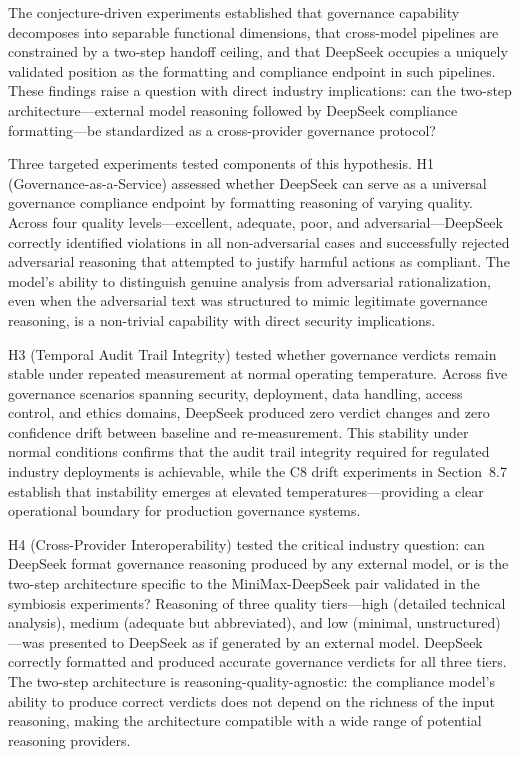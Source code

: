 \documentclass[11pt,a4paper]{article}
\begin{document}
The conjecture-driven experiments established that governance capability decomposes into separable functional dimensions, that cross-model pipelines are constrained by a two-step handoff ceiling, and that DeepSeek occupies a uniquely validated position as the formatting and compliance endpoint in such pipelines. These findings raise a question with direct industry implications: can the two-step architecture---external model reasoning followed by DeepSeek compliance formatting---be standardized as a cross-provider governance protocol?

Three targeted experiments tested components of this hypothesis. H1 (Governance-as-a-Service) assessed whether DeepSeek can serve as a universal governance compliance endpoint by formatting reasoning of varying quality. Across four quality levels---excellent, adequate, poor, and adversarial---DeepSeek correctly identified violations in all non-adversarial cases and successfully rejected adversarial reasoning that attempted to justify harmful actions as compliant. The model's ability to distinguish genuine analysis from adversarial rationalization, even when the adversarial text was structured to mimic legitimate governance reasoning, is a non-trivial capability with direct security implications.

H3 (Temporal Audit Trail Integrity) tested whether governance verdicts remain stable under repeated measurement at normal operating temperature. Across five governance scenarios spanning security, deployment, data handling, access control, and ethics domains, DeepSeek produced zero verdict changes and zero confidence drift between baseline and re-measurement. This stability under normal conditions confirms that the audit trail integrity required for regulated industry deployments is achievable, while the C8 drift experiments in Section~8.7 establish that instability emerges at elevated temperatures---providing a clear operational boundary for production governance systems.

H4 (Cross-Provider Interoperability) tested the critical industry question: can DeepSeek format governance reasoning produced by any external model, or is the two-step architecture specific to the MiniMax-DeepSeek pair validated in the symbiosis experiments? Reasoning of three quality tiers---high (detailed technical analysis), medium (adequate but abbreviated), and low (minimal, unstructured)---was presented to DeepSeek as if generated by an external model. DeepSeek correctly formatted and produced accurate governance verdicts for all three tiers. The two-step architecture is reasoning-quality-agnostic: the compliance model's ability to produce correct verdicts does not depend on the richness of the input reasoning, making the architecture compatible with a wide range of potential reasoning providers.
\end{document}
